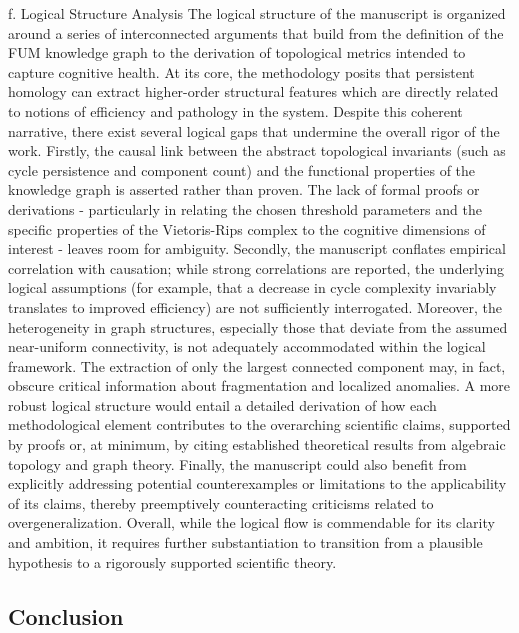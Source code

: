 \documentclass{article}
\begin{document}
f. Logical Structure Analysis  
The logical structure of the manuscript is organized around a series of interconnected arguments that build from the definition of the FUM knowledge graph to the derivation of topological metrics intended to capture cognitive health. At its core, the methodology posits that persistent homology can extract higher-order structural features which are directly related to notions of efficiency and pathology in the system. Despite this coherent narrative, there exist several logical gaps that undermine the overall rigor of the work. Firstly, the causal link between the abstract topological invariants (such as cycle persistence and component count) and the functional properties of the knowledge graph is asserted rather than proven. The lack of formal proofs or derivations - particularly in relating the chosen threshold parameters and the specific properties of the Vietoris-Rips complex to the cognitive dimensions of interest - leaves room for ambiguity. Secondly, the manuscript conflates empirical correlation with causation; while strong correlations are reported, the underlying logical assumptions (for example, that a decrease in cycle complexity invariably translates to improved efficiency) are not sufficiently interrogated. Moreover, the heterogeneity in graph structures, especially those that deviate from the assumed near-uniform connectivity, is not adequately accommodated within the logical framework. The extraction of only the largest connected component may, in fact, obscure critical information about fragmentation and localized anomalies. A more robust logical structure would entail a detailed derivation of how each methodological element contributes to the overarching scientific claims, supported by proofs or, at minimum, by citing established theoretical results from algebraic topology and graph theory. Finally, the manuscript could also benefit from explicitly addressing potential counterexamples or limitations to the applicability of its claims, thereby preemptively counteracting criticisms related to overgeneralization. Overall, while the logical flow is commendable for its clarity and ambition, it requires further substantiation to transition from a plausible hypothesis to a rigorously supported scientific theory.

\hrulefill
\subsection{Conclusion}
\end{document}
